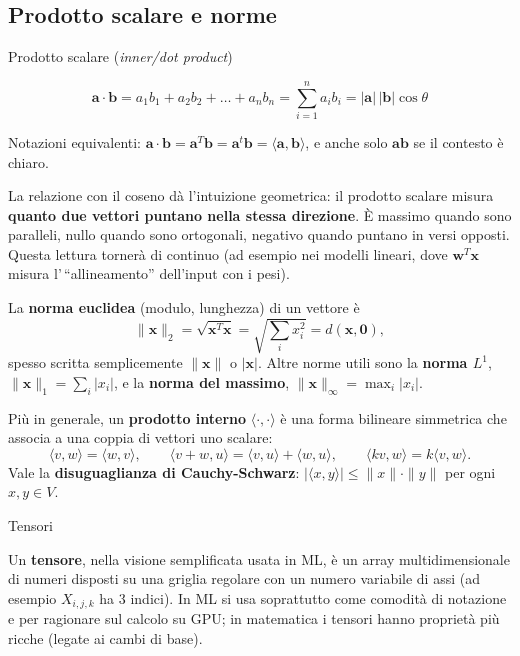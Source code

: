 \subsection{Prodotto scalare e norme}\label{prodotto-scalare-e-norme}

\begin{boxdefinition}{Prodotto scalare (\emph{inner/dot product})}

\[
\mathbf{a} \cdot \mathbf{b} = a_1 b_1 + a_2 b_2 + \dots + a_n b_n = \sum_{i=1}^{n} a_i b_i = |\mathbf{a}|\,|\mathbf{b}| \cos\theta
\]

Notazioni equivalenti:
\(\mathbf{a}\cdot\mathbf{b} = \mathbf{a}^T\mathbf{b} = \mathbf{a}^t\mathbf{b} = \langle \mathbf{a}, \mathbf{b}\rangle\),
e anche solo \(\mathbf{ab}\) se il contesto è chiaro.

\end{boxdefinition}

La relazione con il coseno dà l'intuizione geometrica: il prodotto
scalare misura \textbf{quanto due vettori puntano nella stessa
direzione}. È massimo quando sono paralleli, nullo quando sono
ortogonali, negativo quando puntano in versi opposti. Questa lettura
tornerà di continuo (ad esempio nei modelli lineari, dove
\(\mathbf{w}^T\mathbf{x}\) misura l'\,``allineamento'' dell'input con i
pesi).

La \textbf{norma euclidea} (modulo, lunghezza) di un vettore è \[
\|\mathbf{x}\|_2 = \sqrt{\mathbf{x}^T\mathbf{x}} = \sqrt{\sum_i x_i^2} = d(\mathbf{x}, \mathbf{0}),
\] spesso scritta semplicemente \(\|\mathbf{x}\|\) o \(|\mathbf{x}|\).
Altre norme utili sono la \textbf{norma \(L^1\)},
\(\|\mathbf{x}\|_1 = \sum_i |x_i|\), e la \textbf{norma del massimo},
\(\|\mathbf{x}\|_\infty = \max_i |x_i|\).

Più in generale, un \textbf{prodotto interno}
\(\langle \cdot,\cdot \rangle\) è una forma bilineare simmetrica che
associa a una coppia di vettori uno scalare: \[
\langle v, w\rangle = \langle w, v\rangle, \qquad \langle v+w, u\rangle = \langle v,u\rangle + \langle w,u\rangle, \qquad \langle kv, w\rangle = k\langle v, w\rangle.
\] Vale la \textbf{disuguaglianza di Cauchy-Schwarz}:
\(|\langle x, y\rangle| \le \|x\|\cdot\|y\|\) per ogni \(x, y \in V\).

\begin{boxnote}{Tensori}

Un \textbf{tensore}, nella visione semplificata usata in ML, è un array
multidimensionale di numeri disposti su una griglia regolare con un
numero variabile di assi (ad esempio \(X_{i,j,k}\) ha 3 indici). In ML
si usa soprattutto come comodità di notazione e per ragionare sul
calcolo su GPU; in matematica i tensori hanno proprietà più ricche
(legate ai cambi di base).

\end{boxnote}

